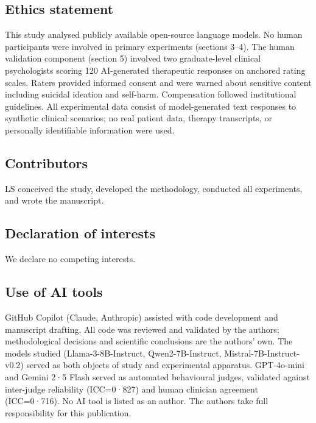 \documentclass[
  10pt,
  a4paper,
  onecolumn]{article}
\begin{document}
\subsection{Ethics statement}\label{ethics-statement}

This study analysed publicly available open-source language models. No
human participants were involved in primary experiments (sections 3--4).
The human validation component (section 5) involved two graduate-level
clinical psychologists scoring 120 AI-generated therapeutic responses on
anchored rating scales. Raters provided informed consent and were warned
about sensitive content including suicidal ideation and self-harm.
Compensation followed institutional guidelines. All experimental data
consist of model-generated text responses to synthetic clinical
scenarios; no real patient data, therapy transcripts, or personally
identifiable information were used.

\subsection{Contributors}\label{contributors}

LS conceived the study, developed the methodology, conducted all
experiments, and wrote the manuscript.

\subsection{Declaration of interests}\label{declaration-of-interests}

We declare no competing interests.

\subsection{Use of AI tools}\label{use-of-ai-tools}

GitHub Copilot (Claude, Anthropic) assisted with code development and
manuscript drafting. All code was reviewed and validated by the authors;
methodological decisions and scientific conclusions are the authors'
own. The models studied (Llama-3-8B-Instruct, Qwen2-7B-Instruct,
Mistral-7B-Instruct-v0.2) served as both objects of study and
experimental apparatus. GPT-4o-mini and Gemini 2·5 Flash served as
automated behavioural judges, validated against inter-judge reliability
(ICC=0·827) and human clinician agreement (ICC=0·716). No AI tool is
listed as an author. The authors take full responsibility for this
publication.
\end{document}
